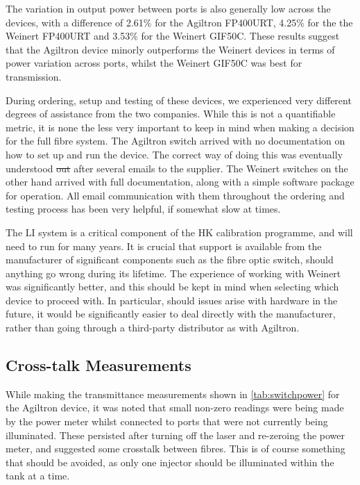 \documentclass[a4paper,11pt]{article}
\providecommand{\DIFdeltex}[1]{{\protect\color{red}\sout{#1}}}                      %
\providecommand{\DIFdelbegin}{} %
\providecommand{\DIFdelend}{} %
\providecommand{\DIFdel}[1]{\texorpdfstring{\DIFdeltex{#1}}{}} %
\newcommand{\DIFscaledelfig}{0.5}
\newlength{\DIFdelgraphicswidth} %
\newlength{\DIFdelgraphicsheight} %
\newcommand{\DIFdelincludegraphics}[2][]{%
\sbox{\DIFdelgraphicsbox}{\DIFOincludegraphics[#1]{#2}}%
\settoboxwidth{\DIFdelgraphicswidth}{\DIFdelgraphicsbox} %
\settoboxtotalheight{\DIFdelgraphicsheight}{\DIFdelgraphicsbox} %
\scalebox{\DIFscaledelfig}{%
\parbox[b]{\DIFdelgraphicswidth}{\usebox{\DIFdelgraphicsbox}\\[-\baselineskip] \rule{\DIFdelgraphicswidth}{0em}}\llap{\resizebox{\DIFdelgraphicswidth}{\DIFdelgraphicsheight}{%
\setlength{\unitlength}{\DIFdelgraphicswidth}%
\begin{picture}(1,1)%
\thicklines\linethickness{2pt} %
{\color[rgb]{1,0,0}\put(0,0){\framebox(1,1){}}}%
{\color[rgb]{1,0,0}\put(0,0){\line( 1,1){1}}}%
{\color[rgb]{1,0,0}\put(0,1){\line(1,-1){1}}}%
\end{picture}%
}\hspace*{3pt}}} %
} %
\DeclareRobustCommand{\DIFdelbegin}{\DIFOdelbegin \let\includegraphics\DIFdelincludegraphics} %
\DeclareRobustCommand{\DIFdelend}{\DIFOaddend \let\includegraphics\DIFOincludegraphics} %
\begin{document}
The variation in output power between ports is also generally low across the devices, with a difference of 2.61\% for the Agiltron FP400URT, 4.25\% for the the Weinert FP400URT and 3.53\% for the Weinert GIF50C. These results suggest that the Agiltron device minorly outperforms the Weinert devices in terms of power variation across ports, whilst the Weinert GIF50C was best for transmission.

During ordering, setup and testing of these devices, we experienced very different degrees of assistance from the two companies. While this is not a quantifiable metric, it is none the less very important to keep in mind when making a decision for the full fibre system. The Agiltron switch arrived with no documentation on how to set up and run the device. The correct way of doing this was eventually understood \DIFdelbegin \DIFdel{out }\DIFdelend after several emails to the supplier. The Weinert switches on the other hand arrived with full documentation, along with a simple software package for operation. All email communication with them throughout the ordering and testing process has been very helpful, if somewhat slow at times.

The LI system is a critical component of the HK calibration programme, and will need to run for many years. It is crucial that support is available from the manufacturer of significant components such as the fibre optic switch, should anything go wrong during its lifetime. The experience of working with Weinert was significantly better, and this should be kept in mind when selecting which device to proceed with. In particular, should issues arise with hardware in the future, it would be significantly easier to deal directly with the manufacturer, rather than going through a third-party distributor as with Agiltron.


\subsection{Cross-talk Measurements}

While making the transmittance measurements shown in \cref{tab:switchpower} for the Agiltron device, it was noted that small non-zero readings were being made by the power meter whilst connected to ports that were not currently being illuminated. These persisted after turning off the laser and re-zeroing the power meter, and suggested some crosstalk between fibres. This is of course something that should be avoided, as only one injector should be illuminated within the tank at a time.
\end{document}
